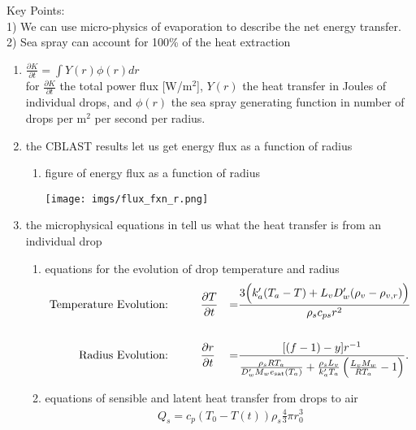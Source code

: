 \documentclass[10pt,a4paper]{article}
\begin{document}
\noindent Key Points: \\
1) We can use micro-physics of evaporation to describe the net energy transfer.\\
2) Sea spray can account for 100\% of the heat extraction
\bigskip

 \renewcommand{\theenumi}{\Roman{enumi}}
 \renewcommand{\theenumii}{\arabic{enumii}}
 \renewcommand{\theenumiii}{\alpha{enumiii}}
\begin{enumerate}
\item $\frac{\partial K}{\partial t} = \int Y(r)\phi(r) dr\label{eq:Kdt}$\\
for $\frac{\partial K}{\partial t}$ the total power flux [W/m$^2$], $Y(r)$ the heat transfer in Joules of individual drops, and $\phi(r)$ the sea spray generating function in number of drops per m$^2$ per second per radius. 
\item the CBLAST results let us get energy flux as a function of radius
\begin{enumerate}
\item figure of energy flux as a function of radius
\begin{center}
\texttt{[image: imgs/flux\_fxn\_r.png]}
\end{center}
\end{enumerate}
\item the microphysical equations in \citet{Pruppacher1978} tell us what the heat transfer is from an individual drop\\
\begin{enumerate}
\item equations for the evolution of drop temperature and radius\\
\begin{align*}
\text{Temperature Evolution:}&\hspace*{1cm}\frac{\partial T}{\partial t} &=& \frac{3\Big(k_a'(T_a-T)+L_vD_w'(\rho_v-\rho_{v,r})\Big)}{\rho_sc_{ps}r^2}\\
\vspace*{0.25cm}\\
\text{Radius Evolution:}&\hspace*{1cm}\frac{\partial r}{\partial t} &=& \frac{[(f-1)-y]r^{-1}}{\frac{\rho_sRT_a}{D_w'M_we_{\text{sat}}(T_a)}+\frac{\rho_sL_v}{k_a'T_a}\left(\frac{L_vM_w}{RT_a}-1\right)}.
\end{align*}
\item equations of sensible and latent heat transfer from drops to air 
\begin{align*}
Q_s = c_p(T_0-T(t))\rho_s\frac{4}{3}\pi r_0^3\\

\end{align*}
\end{enumerate}
\end{enumerate}
\end{document}
